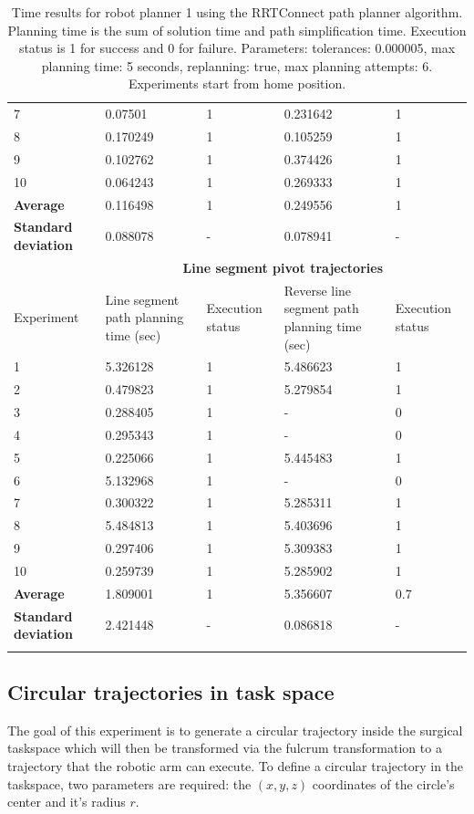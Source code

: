 \begin{longtable}{|p{}|p{}|p{}|p{}|p{}|}
7 & 0.07501 & 1 & 0.231642 & 1 \\
8 & 0.170249 & 1 & 0.105259 & 1 \\
9 & 0.102762 & 1 & 0.374426 & 1 \\
10 & 0.064243 & 1 & 0.269333 & 1 \\
\hline
\textbf{Average} & 0.116498 &	1 &	0.249556 &	1 \\
\hline
\textbf{Standard deviation} & 	0.088078 &	- &	0.078941 & - \\
\hline
                          & \multicolumn{4}{c}{\textbf{Line segment pivot trajectories}}                     \vline \\
\hline
Experiment                & Line segment path planning time (sec) & Execution status & Reverse line segment path planning time (sec) & Execution status  \\
\hline
1 & 5.326128 & 1 & 5.486623 & 1 \\
2 & 0.479823 & 1 & 5.279854 & 1 \\
3 & 0.288405 & 1 & - & 0 \\
4 & 0.295343 & 1 & - & 0 \\
5 & 0.225066 & 1 & 5.445483 & 1 \\
6 & 5.132968 & 1 & - & 0 \\
7 & 0.300322 & 1 & 5.285311 & 1 \\
8 & 5.484813 & 1 & 5.403696 & 1 \\
9 & 0.297406 & 1 & 5.309383 & 1 \\
10 & 0.259739 & 1 & 5.285902 & 1 \\
\hline
\textbf{Average} & 1.809001 &	1 &	5.356607 &	0.7 \\
\hline
\textbf{Standard deviation} & 	2.421448 &	- &	0.086818 & - \\
\hline
\caption{Time results for robot planner 1 using the RRTConnect path planner algorithm. Planning time is the sum of solution time and path simplification time. Execution status is 
1 for success and 0 for failure. Parameters: tolerances: 0.000005, max planning time: 5 seconds, replanning: true, max planning attempts: 6. Experiments start from home position.}
\label{robot-planner3b-rrtconnect-data}
\end{longtable}


\subsection{Circular trajectories in task space}

The goal of this experiment is to generate a circular trajectory inside the surgical taskspace which will then be transformed via the fulcrum transformation 
to a trajectory that the robotic arm can execute. To define a circular trajectory in the taskspace, two parameters are required: the $(x,y,z)$ coordinates of the 
circle's center and it's radius $r$.\\ 

